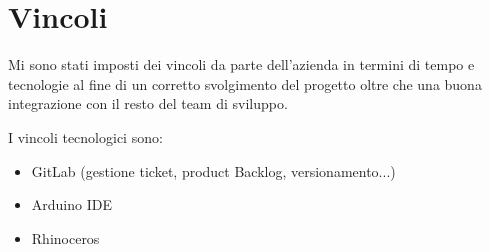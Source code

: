 \section{Vincoli}
Mi sono stati imposti dei vincoli da parte dell'azienda in termini di tempo e tecnologie al fine di un corretto svolgimento del progetto oltre che una buona integrazione con il resto del team di sviluppo.

I vincoli tecnologici sono:
\begin{itemize}
\item GitLab (gestione ticket, product Backlog, versionamento...)
\item Arduino IDE
\item Rhinoceros
\end{itemize}
